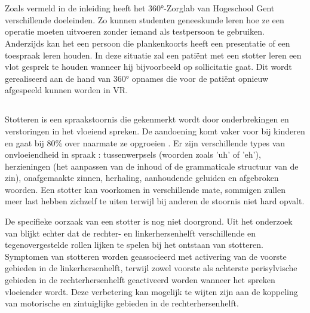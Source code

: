 \chapter{} \label{chap:State of the art}%
\label{ch:stand-van-zaken}



Zoals vermeld in de inleiding heeft het 360°-Zorglab van Hogeschool Gent verschillende doeleinden. Zo kunnen studenten geneeskunde leren hoe ze een operatie moeten uitvoeren zonder iemand als testpersoon te gebruiken. Anderzijds kan het een persoon die plankenkoorts heeft een presentatie of een toespraak leren houden. In deze situatie zal een patiënt met een stotter leren een vlot gesprek te houden wanneer hij bijvoorbeeld op sollicitatie gaat. Dit wordt gerealiseerd aan de hand van 360° opnames die voor de patiënt opnieuw afgespeeld kunnen worden in VR.

\section{}%
Stotteren is een spraakstoornis die gekenmerkt wordt door onderbrekingen en verstoringen in het vloeiend spreken. De aandoening komt vaker voor bij kinderen en gaat bij 80\% over naarmate ze opgroeien \autocite{Gordon2002}. Er zijn verschillende types van onvloeiendheid in spraak \autocite{Chee2009}: tussenwerpsels (woorden zoals 'uh' of 'eh'), herzieningen (het aanpassen van de inhoud of de grammaticale structuur van de zin), onafgemaakte zinnen, herhaling, aanhoudende geluiden en afgebroken woorden. Een stotter kan voorkomen in verschillende mate, sommigen zullen meer last hebben zichzelf te uiten terwijl bij anderen de stoornis niet hard opvalt.

De specifieke oorzaak van een stotter is nog niet doorgrond. Uit het onderzoek van \textcite{Gordon2002} blijkt echter dat de rechter- en linkerhersenhelft verschillende en tegenovergestelde rollen lijken te spelen bij het ontstaan van stotteren. Symptomen van stotteren worden geassocieerd met activering van de voorste gebieden in de linkerhersenhelft, terwijl zowel voorste als achterste perisylvische gebieden in de rechterhersenhelft geactiveerd worden wanneer het spreken vloeiender wordt. Deze verbetering kan mogelijk te wijten zijn aan de koppeling van motorische en zintuiglijke gebieden in de rechterhersenhelft.


